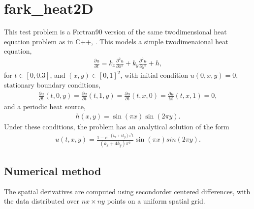 \documentclass[letterpaper,10pt,english]{sphinxmanual}
\begin{document}
\section{fark\_heat2D}
\label{\detokenize{f90_parallel:fark-heat2d}}\label{\detokenize{f90_parallel:id1}}
\sphinxAtStartPar
This test problem is a Fortran\sphinxhyphen{}90 version of the same two\sphinxhyphen{}dimensional
heat equation problem as in C++, {\hyperref[\detokenize{cpp_parallel:ark-heat2d}]{}}.  This models a
simple two\sphinxhyphen{}dimenaional heat equation,
\begin{equation*}
\begin{split}\frac{\partial u}{\partial t} = k_x \frac{\partial^2 u}{\partial x^2}
                              + k_y \frac{\partial^2 u}{\partial y^2} + h,\end{split}
\end{equation*}
\sphinxAtStartPar
for \(t \in [0, 0.3]\), and \((x,y) \in [0, 1]^2\), with initial
condition \(u(0,x,y) = 0\), stationary boundary conditions,
\begin{equation*}
\begin{split}\frac{\partial u}{\partial t}(t,0,y) = \frac{\partial u}{\partial t}(t,1,y) =
\frac{\partial u}{\partial t}(t,x,0) = \frac{\partial u}{\partial t}(t,x,1) = 0,\end{split}
\end{equation*}
\sphinxAtStartPar
and a periodic heat source,
\begin{equation*}
\begin{split}h(x,y) = \sin(\pi x) \sin(2\pi y).\end{split}
\end{equation*}
\sphinxAtStartPar
Under these conditions, the problem has an analytical solution of the
form
\begin{equation*}
\begin{split}u(t,x,y) = \frac{1 - e^{-(k_x+4k_y)\pi^2 t}}{(k_x+4k_y)\pi^2} \sin(\pi x) sin(2\pi y).\end{split}
\end{equation*}

\subsection{Numerical method}
\label{\detokenize{f90_parallel:numerical-method}}
\sphinxAtStartPar
The spatial derivatives are computed using second\sphinxhyphen{}order centered
differences, with the data distributed over \(nx\times ny\) points
on a uniform spatial grid.
\end{document}

